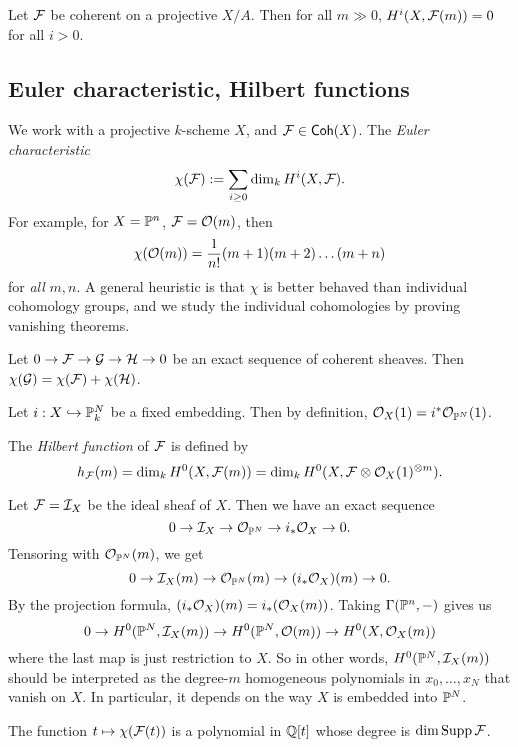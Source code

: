 \documentclass[11pt]{amsart}
\begin{document}
\begin{thm}
    Let $\mathcal{F}$ be coherent on a projective $X/A$. Then for all $m\gg 0$, $H^i(X, \mathcal{F}(m)) = 0$ for all $i>0$. 
\end{thm}

\subsection{Euler characteristic, Hilbert functions}

We work with a projective $k$-scheme $X$, and $\mathcal{F}\in \mathsf{Coh}(X)$. The \emph{Euler characteristic} 
\[\chi(\mathcal{F}) := \sum_{i \ge 0} \dim_k H^i(X, \mathcal{F}).\]
For example, for $X=\mathbb{P}^n$, $\mathcal{F} = \mathcal{O}(m)$, then
\[\chi(\mathcal{O}(m)) = \frac{1}{n!}(m+1)(m+2)\dots (m+n)\]
for \emph{all} $m,n$. A general heuristic is that $\chi$ is better behaved than individual cohomology groups, and we study the individual cohomologies by proving vanishing theorems.

\begin{prop}
    Let $0\to \mathcal{F}\to \mathcal{G}\to \mathcal{H}\to 0$ be an exact sequence of coherent sheaves. Then $\chi(\mathcal{G}) = \chi(\mathcal{F}) + \chi(\mathcal{H})$.
\end{prop}

Let $i:X\hookrightarrow \mathbb{P}_k^N$ be a fixed embedding. Then by definition, $\mathcal{O}_X(1) = i^\ast \mathcal{O}_{\mathbb{P}^N}(1)$. 

\begin{defn}
    The \emph{Hilbert function} of $\mathcal{F}$ is defined by
    \[h_{\mathcal{F}}(m) = \dim_k H^0(X, \mathcal{F}(m)) =  \dim_k H^0(X, \mathcal{F}\otimes \mathcal{O}_X(1)^{\otimes m}).\]
\end{defn}

\begin{exm}
    Let $\mathcal{F} = \mathcal{I}_X$ be the ideal sheaf of $X$. Then we have an exact sequence
    \[0\to \mathcal{I}_X \to \mathcal{O}_{\mathbb{P}^N} \to i_\ast \mathcal{O}_X \to 0.\]
    Tensoring with $\mathcal{O}_{\mathbb{P}^N}(m)$, we get
    \[0\to \mathcal{I}_X(m) \to \mathcal{O}_{\mathbb{P}^N}(m) \to (i_\ast \mathcal{O}_X)(m) \to 0.\]
    By the projection formula, $(i_\ast \mathcal{O}_X)(m) = i_\ast(\mathcal{O}_X(m))$. Taking $\Gamma(\mathbb{P}^n,-)$ gives us
    \[0\to H^0(\mathbb{P}^N, \mathcal{I}_X(m)) \to H^0(\mathbb{P}^N, \mathcal{O}(m)) \to H^0(X, \mathcal{O}_X(m))\]
    where the last map is just restriction to $X$.
    So in other words, $H^0(\mathbb{P}^N, \mathcal{I}_X(m))$ should be interpreted as the degree-$m$ homogeneous polynomials in $x_0,\dots,x_N$ that vanish on $X$. In particular, it depends on the way $X$ is embedded into $\mathbb{P}^N$.
\end{exm}



\begin{thm}
    The function $t\mapsto \chi(\mathcal{F}(t))$ is a polynomial in $\mathbb{Q}[t]$ whose degree is $\dim \operatorname{Supp} \mathcal{F}$.
\end{thm}
\end{document}
